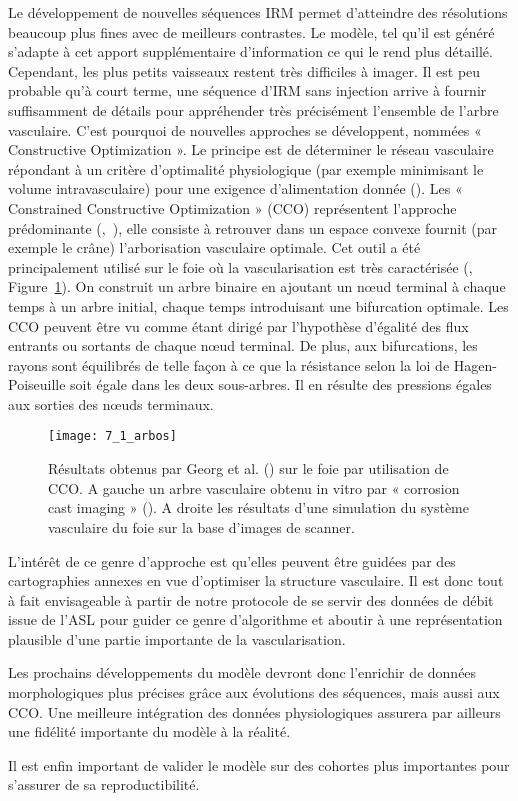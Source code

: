 Le développement de nouvelles séquences IRM permet d’atteindre des résolutions beaucoup
plus fines avec de meilleurs contrastes. Le modèle, tel qu’il est généré s’adapte à cet apport
supplémentaire d’information ce qui le rend plus détaillé. Cependant, les plus petits vaisseaux restent
très difficiles à imager. Il est peu probable qu’à court terme, une séquence d’IRM sans injection arrive
à fournir suffisamment de détails pour appréhender très précisément l’ensemble de l’arbre vasculaire.
C’est pourquoi de nouvelles approches se développent, nommées « Constructive Optimization ». Le
principe est de déterminer le réseau vasculaire répondant à un critère d’optimalité physiologique (par
exemple minimisant le volume intravasculaire) pour une exigence d’alimentation donnée (\cite{Schwen2012}). Les
« Constrained Constructive Optimization » (CCO) représentent l’approche prédominante (\cite{Schreiner1993},~\cite{Karch1998}),
elle consiste à retrouver dans un espace convexe fournit (par exemple le crâne) l’arborisation
vasculaire optimale. Cet outil a été principalement utilisé sur le foie où la vascularisation est très
caractérisée  (\cite{Georg2010}, Figure~\ref{fig:7_1_arbos}). On construit un arbre binaire en ajoutant un nœud terminal à chaque
temps à un arbre initial, chaque temps introduisant une bifurcation optimale. Les CCO peuvent être vu
comme étant dirigé par l’hypothèse d’égalité des flux entrants ou sortants de chaque nœud terminal.
De plus, aux bifurcations, les rayons sont équilibrés de telle façon à ce que la résistance selon la loi de
Hagen-Poiseuille soit égale dans les deux sous-arbres. Il en résulte des pressions égales aux sorties des
nœuds terminaux.

\begin{figure}[!t]
\centering
\texttt{[image: 7\_1\_arbos]}
\caption{Résultats obtenus par Georg et al. (\cite{Georg2010}) sur le foie par utilisation de CCO. A gauche un arbre vasculaire obtenu in
vitro par « corrosion cast imaging » (\cite{Hahn2003}). A droite les résultats d’une simulation du système vasculaire du foie sur la base
d’images de scanner.}
\label{fig:7_1_arbos}	
\end{figure}
L’intérêt de ce genre d’approche est qu’elles peuvent être guidées par des cartographies annexes en
vue d’optimiser la structure vasculaire. Il est donc tout à fait envisageable à partir de notre protocole
de se servir des données de débit issue de l’ASL pour guider ce genre d’algorithme et aboutir à une
représentation plausible d’une partie importante de la vascularisation.

Les prochains développements du modèle devront donc l’enrichir de données morphologiques
plus précises grâce aux évolutions des séquences, mais aussi aux CCO. Une meilleure intégration des
données physiologiques assurera par ailleurs une fidélité importante du modèle à la réalité.

Il est enfin important de valider le modèle sur des cohortes plus importantes pour s’assurer de sa reproductibilité. 







{}
